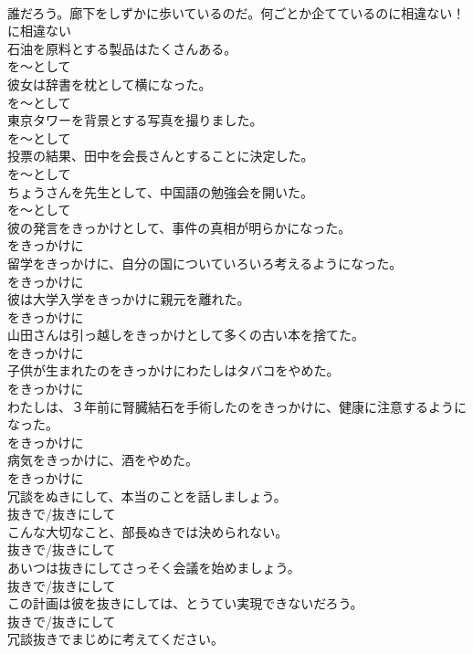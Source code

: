 \documentclass[8pt]{extreport}
\begin{document}
\begin{CJK}{UTF8}{min}
\\	誰だろう。廊下をしずかに歩いているのだ。何ごとか企てているのに相違ない！	
\\	に相違ない
\\	石油を原料とする製品はたくさんある。	
\\	を～として
\\	彼女は辞書を枕として横になった。	
\\	を～として
\\	東京タワーを背景とする写真を撮りました。	
\\	を～として
\\	投票の結果、田中を会長さんとすることに決定した。	
\\	を～として
\\	ちょうさんを先生として、中国語の勉強会を開いた。	
\\	を～として
\\	彼の発言をきっかけとして、事件の真相が明らかになった。	
\\	をきっかけに
\\	留学をきっかけに、自分の国についていろいろ考えるようになった。	
\\	をきっかけに
\\	彼は大学入学をきっかけに親元を離れた。	
\\	をきっかけに
\\	山田さんは引っ越しをきっかけとして多くの古い本を捨てた。	
\\	をきっかけに
\\	子供が生まれたのをきっかけにわたしはタバコをやめた。	
\\	をきっかけに
\\	わたしは、３年前に腎臓結石を手術したのをきっかけに、健康に注意するようになった。	
\\	をきっかけに
\\	病気をきっかけに、酒をやめた。	
\\	をきっかけに
\\	冗談をぬきにして、本当のことを話しましょう。	
\\	抜きで/抜きにして
\\	こんな大切なこと、部長ぬきでは決められない。	
\\	抜きで/抜きにして
\\	あいつは抜きにしてさっそく会議を始めましょう。	
\\	抜きで/抜きにして
\\	この計画は彼を抜きにしては、とうてい実現できないだろう。	
\\	抜きで/抜きにして
\\	冗談抜きでまじめに考えてください。	

\end{CJK}
\end{document}
